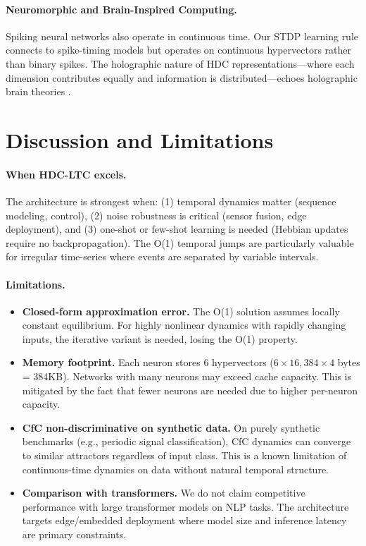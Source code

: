 \documentclass{article}
\begin{document}
\paragraph{Neuromorphic and Brain-Inspired Computing.} Spiking neural networks \cite{maass1997networks} also operate in continuous time. Our STDP learning rule connects to spike-timing models but operates on continuous hypervectors rather than binary spikes. The holographic nature of HDC representations---where each dimension contributes equally and information is distributed---echoes holographic brain theories \cite{pribram1971languages}.

\section{Discussion and Limitations}
\label{sec:discussion}

\paragraph{When HDC-LTC excels.} The architecture is strongest when: (1) temporal dynamics matter (sequence modeling, control), (2) noise robustness is critical (sensor fusion, edge deployment), and (3) one-shot or few-shot learning is needed (Hebbian updates require no backpropagation). The O(1) temporal jumps are particularly valuable for irregular time-series where events are separated by variable intervals.

\paragraph{Limitations.}
\begin{itemize}
    \item \textbf{Closed-form approximation error.} The O(1) solution assumes locally constant equilibrium. For highly nonlinear dynamics with rapidly changing inputs, the iterative variant is needed, losing the O(1) property.
    \item \textbf{Memory footprint.} Each neuron stores 6 hypervectors ($6 \times 16{,}384 \times 4$ bytes = 384KB). Networks with many neurons may exceed cache capacity. This is mitigated by the fact that fewer neurons are needed due to higher per-neuron capacity.
    \item \textbf{CfC non-discriminative on synthetic data.} On purely synthetic benchmarks (e.g., periodic signal classification), CfC dynamics can converge to similar attractors regardless of input class. This is a known limitation of continuous-time dynamics on data without natural temporal structure.
    \item \textbf{Comparison with transformers.} We do not claim competitive performance with large transformer models on NLP tasks. The architecture targets edge/embedded deployment where model size and inference latency are primary constraints.
\end{itemize}
\end{document}
